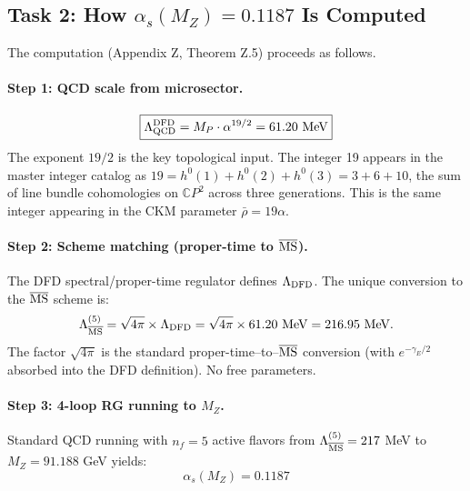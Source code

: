 \subsection{Task 2: How $\alpha_s(M_Z) = 0.1187$ Is Computed}
\label{sec:alpha-s-computation}

The computation (Appendix Z, Theorem Z.5) proceeds as follows.

\paragraph{Step 1: QCD scale from microsector.}
\begin{equation}
\boxed{\Lambda_{\rm QCD}^{\rm DFD} = M_P \cdot \alpha^{19/2} = 61.20~\text{MeV}}
\end{equation}
The exponent $19/2$ is the key topological input. The integer 19 appears in the
master integer catalog as $19 = h^0(1) + h^0(2) + h^0(3) = 3 + 6 + 10$,
the sum of line bundle cohomologies on $\mathbb{C}P^2$ across three generations.
This is the same integer appearing in the CKM parameter $\bar{\rho} = 19\alpha$.

\paragraph{Step 2: Scheme matching (proper-time to $\overline{\rm MS}$).}
The DFD spectral/proper-time regulator defines $\Lambda_{\rm DFD}$.
The unique conversion to the $\overline{\rm MS}$ scheme is:
\begin{equation}
\Lambda_{\overline{\rm MS}}^{(5)} = \sqrt{4\pi} \times \Lambda_{\rm DFD}
= \sqrt{4\pi} \times 61.20~\text{MeV} = 216.95~\text{MeV}.
\end{equation}
The factor $\sqrt{4\pi}$ is the standard proper-time--to--$\overline{\rm MS}$ conversion
(with $e^{-\gamma_E/2}$ absorbed into the DFD definition). No free parameters.

\paragraph{Step 3: 4-loop RG running to $M_Z$.}
Standard QCD running with $n_f = 5$ active flavors from $\Lambda_{\overline{\rm MS}}^{(5)} = 217$ MeV
to $M_Z = 91.188$ GeV yields:
\begin{equation}
\boxed{\alpha_s(M_Z) = 0.1187}
\end{equation}

